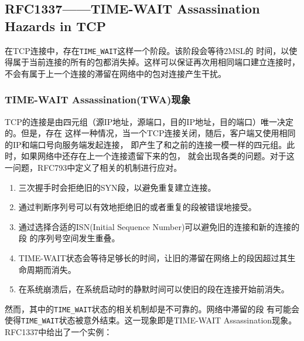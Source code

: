 \subsection{RFC1337——TIME-WAIT Assassination Hazards in TCP}
\label{subsec:rfc1337}
在TCP连接中，存在\texttt{TIME_WAIT}这样一个阶段。该阶段会等待2MSL的
时间，以使得属于当前连接的所有的包都消失掉。这样可以保证再次用相同端口建立连接时，
不会有属于上一个连接的滞留在网络中的包对连接产生干扰。

\subsubsection{TIME-WAIT Assassination(TWA)现象}
\label{subsec:time_wait_assassination}
TCP的连接是由四元组（源IP地址，源端口，目的IP地址，目的端口）唯一决定的。但是，存在
这样一种情况，当一个TCP连接关闭，随后，客户端又使用相同的IP和端口号向服务端发起连接，
即产生了和之前的连接一模一样的四元组。此时，如果网络中还存在上一个连接遗留下来的包，
就会出现各类的问题。对于这一问题，RFC793中定义了相关的机制进行应对。

\begin{enumerate}
\item 三次握手时会拒绝旧的SYN段，以避免重复建立连接。
\item 通过判断序列号可以有效地拒绝旧的或者重复的段被错误地接受。
\item 通过选择合适的ISN(Initial Sequence Number)可以避免旧的连接和新的连接的段
的序列号空间发生重叠。
\item TIME-WAIT状态会等待足够长的时间，让旧的滞留在网络上的段因超过其生命周期而消失。
\item 在系统崩溃后，在系统启动时的静默时间可以使旧的段在连接开始前消失。
\end{enumerate}

然而，其中的\texttt{TIME_WAIT}状态的相关机制却是不可靠的。网络中滞留的段
有可能会使得\texttt{TIME_WAIT}状态被意外结束。这一现象即是TIME-WAIT 
Assassination现象。RFC1337中给出了一个实例：

